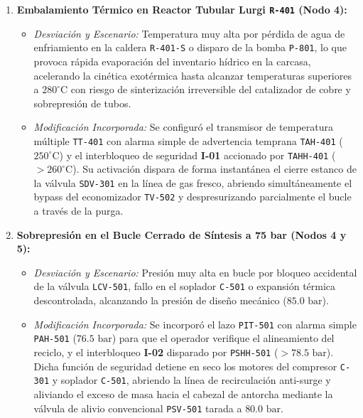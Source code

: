 \documentclass[10pt,letterpaper]{article}
\begin{document}
\begin{enumerate}
    \item \textbf{Embalamiento Térmico en Reactor Tubular Lurgi \texttt{R-401} (Nodo 4):}
    \begin{itemize}
        \item \textit{Desviación y Escenario:} Temperatura muy alta por pérdida de agua de enfriamiento en la caldera \texttt{R-401-S} o disparo de la bomba \texttt{P-801}, lo que provoca rápida evaporación del inventario hídrico en la carcasa, acelerando la cinética exotérmica hasta alcanzar temperaturas superiores a $280^\circ\text{C}$ con riesgo de sinterización irreversible del catalizador de cobre y sobrepresión de tubos.
        \item \textit{Modificación Incorporada:} Se configuró el transmisor de temperatura múltiple \texttt{TT-401} con alarma simple de advertencia temprana \texttt{TAH-401} ($250^\circ\text{C}$) y el interbloqueo de seguridad \textbf{I-01} accionado por \texttt{TAHH-401} ($>260^\circ\text{C}$). Su activación dispara de forma instantánea el cierre estanco de la válvula \texttt{SDV-301} en la línea de gas fresco, abriendo simultáneamente el bypass del economizador \texttt{TV-502} y despresurizando parcialmente el bucle a través de la purga.
    \end{itemize}
    
    \item \textbf{Sobrepresión en el Bucle Cerrado de Síntesis a 75 bar (Nodos 4 y 5):}
    \begin{itemize}
        \item \textit{Desviación y Escenario:} Presión muy alta en bucle por bloqueo accidental de la válvula \texttt{LCV-501}, fallo en el soplador \texttt{C-501} o expansión térmica descontrolada, alcanzando la presión de diseño mecánico ($85.0\text{ bar}$).
        \item \textit{Modificación Incorporada:} Se incorporó el lazo \texttt{PIT-501} con alarma simple \texttt{PAH-501} ($76.5\text{ bar}$) para que el operador verifique el alineamiento del reciclo, y el interbloqueo \textbf{I-02} disparado por \texttt{PSHH-501} ($>78.5\text{ bar}$). Dicha función de seguridad detiene en seco los motores del compresor \texttt{C-301} y soplador \texttt{C-501}, abriendo la línea de recirculación anti-surge y aliviando el exceso de masa hacia el cabezal de antorcha mediante la válvula de alivio convencional \texttt{PSV-501} tarada a $80.0\text{ bar}$.
    \end{itemize}


\end{enumerate}
\end{document}
